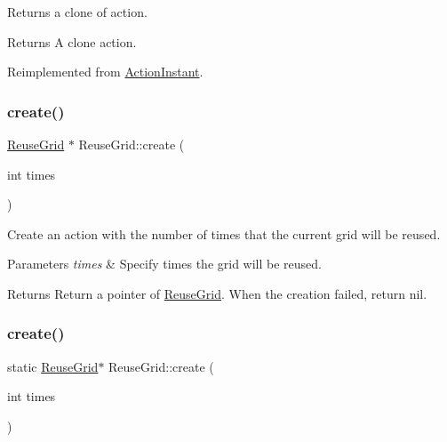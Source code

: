 Returns a clone of action.

\begin{DoxyReturn}{Returns}
A clone action. 
\end{DoxyReturn}


Reimplemented from \hyperlink{classActionInstant_adb76fc6f006098109e8256210cbd8cc0}{Action\+Instant}.

\mbox{\label{classReuseGrid_acb57eaff876f9b0c5c7f97842bcc8e6f}} 
\subsubsection{\texorpdfstring{create()}{create()}\hspace{0.1cm}{\footnotesize\ttfamily [1/2]}}
{\footnotesize\ttfamily \hyperlink{classReuseGrid}{Reuse\+Grid} $\ast$ Reuse\+Grid\+::create (\begin{DoxyParamCaption}\item[{int}]{times }\end{DoxyParamCaption})\hspace{0.3cm}{\ttfamily [static]}}



Create an action with the number of times that the current grid will be reused. 


\begin{DoxyParams}{Parameters}
{\em times} & Specify times the grid will be reused. \\
\hline
\end{DoxyParams}
\begin{DoxyReturn}{Returns}
Return a pointer of \hyperlink{classReuseGrid}{Reuse\+Grid}. When the creation failed, return nil. 
\end{DoxyReturn}
\mbox{\label{classReuseGrid_ab3a9fcff1ad7007043356387489bc5c3}} 
\subsubsection{\texorpdfstring{create()}{create()}\hspace{0.1cm}{\footnotesize\ttfamily [2/2]}}
{\footnotesize\ttfamily static \hyperlink{classReuseGrid}{Reuse\+Grid}$\ast$ Reuse\+Grid\+::create (\begin{DoxyParamCaption}\item[{int}]{times }\end{DoxyParamCaption})\hspace{0.3cm}{\ttfamily [static]}}




